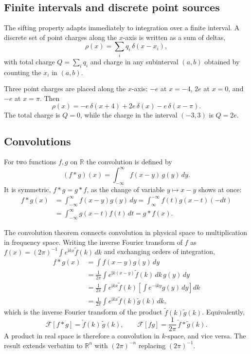 \subsection{Finite intervals and discrete point sources}

The sifting property adapts immediately to integration over a finite interval. A discrete set of point charges along the $x$-axis is written as a sum of deltas,
\begin{equation}
\rho(x)=\sum_i q_i\,\delta(x-x_i),
\end{equation}
with total charge $Q=\sum_i q_i$ and charge in any subinterval $(a,b)$ obtained by counting the $x_i$ in $(a,b)$.

\begin{example}
Three point charges are placed along the $x$-axis: $-e$ at $x=-4$, $2e$ at $x=0$, and $-e$ at $x=\pi$. Then
\begin{equation}
\rho(x)=-e\,\delta(x+4)+2e\,\delta(x)-e\,\delta(x-\pi).
\end{equation}
The total charge is $Q=0$, while the charge in the interval $(-3,3)$ is $Q=2e$.
\end{example}

\subsection{Convolutions}

For two functions $f,g$ on $\mathbb{R}$ the convolution is defined by
\begin{equation}
(f*g)(x)=\int_{-\infty}^{\infty}f(x-y)\,g(y)\,dy.
\end{equation}
It is symmetric, $f*g=g*f$, as the change of variable $y\mapsto x-y$ shows at once:
\begin{align}
f*g(x)&=\int_{-\infty}^{\infty}f(x-y)g(y)\,dy
=\int_{\infty}^{-\infty}f(t)g(x-t)(-dt)\\
&=\int_{-\infty}^{\infty}g(x-t)f(t)\,dt=g*f(x).
\end{align}

The convolution theorem connects convolution in physical space to multiplication in frequency space. Writing the inverse Fourier transform of $f$ as $f(x)=(2\pi)^{-1}\int e^{\mathrm{i}kx}\widetilde f(k)\,dk$ and exchanging orders of integration,
\begin{align}
f*g(x)&=\int f(x-y)g(y)\,dy\\
&=\frac{1}{2\pi}\int e^{\mathrm{i}k(x-y)}\widetilde f(k)\,dk\,g(y)\,dy\\
&=\frac{1}{2\pi}\int e^{\mathrm{i}kx}\widetilde f(k)\!\left[\int e^{-\mathrm{i}ky}g(y)\,dy\right]dk\\
&=\frac{1}{2\pi}\int e^{\mathrm{i}kx}\widetilde f(k)\widetilde g(k)\,dk,
\end{align}
which is the inverse Fourier transform of the product $\widetilde f(k)\widetilde g(k)$. Equivalently,
\begin{equation}
\mathcal{F}[f*g]=\widetilde f(k)\,\widetilde g(k),
\qquad
\mathcal{F}[fg]=\frac{1}{2\pi}\,\widetilde f*\widetilde g(k).
\end{equation}
A product in real space is therefore a convolution in $k$-space, and vice versa. The result extends verbatim to $\mathbb{R}^n$ with $(2\pi)^{-n}$ replacing $(2\pi)^{-1}$.

